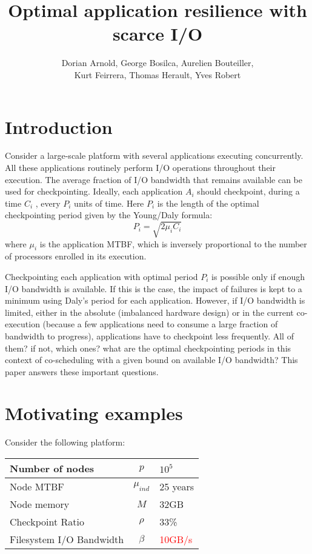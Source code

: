 \documentclass{article}
\author{Dorian Arnold, George Bosilca, Aurelien Bouteiller,\\
 Kurt Feirrera, Thomas Herault, Yves Robert}
\title{Optimal application resilience with scarce I/O}
\begin{document}
\maketitle

\section{Introduction}

Consider a large-scale platform with several applications executing
concurrently. All these applications routinely perform I/O operations
throughout their execution. The average fraction of I/O bandwidth that
remains available can be used for checkpointing. Ideally, each application $A_{i}$
should checkpoint, during a time $C_{i}$ , 
every $P_{i}$ units of time. Here $P_{i}$ is the length of the
optimal checkpointing period given by the Young/Daly formula:
$$P_{i} = \sqrt{2 \mu_{i} C_{i}}$$
where $\mu_{i}$ is the application MTBF, which is inversely proportional to the number of processors enrolled in its execution.
 
Checkpointing each application with optimal period $P_{i}$ is possible
only if enough I/O bandwidth is available. If this is the case, the impact of failures is kept to a minimum using Daly's period for each application.
However, if I/O bandwidth is limited, either in the absolute (imbalanced hardware design)
or in the current co-execution (because  a few applications need to consume a large fraction of  bandwidth to progress), applications have to checkpoint less frequently.
All of them? if not, which ones? what are the optimal checkpointing periods in this context of co-scheduling with  a  given bound
on available I/O  bandwidth? This paper answers these important questions.


\section{Motivating examples}
\label{sec.example}

Consider the following platform:

\begin{center}
\begin{tabular}{l|c|l}
  Number of nodes & $p$             & $10^5$ \\\hline
  Node MTBF           & $\mu_{ind}$ & 25 years\\\hline
  Node memory      & $M$             & 32GB\\\hline
  Checkpoint Ratio & $\rho$         & 33\%\\\hline
  Filesystem I/O Bandwidth & $\beta$ & \textcolor{red}{10GB/s}\\
\end{tabular}
\end{center}
\end{document}
